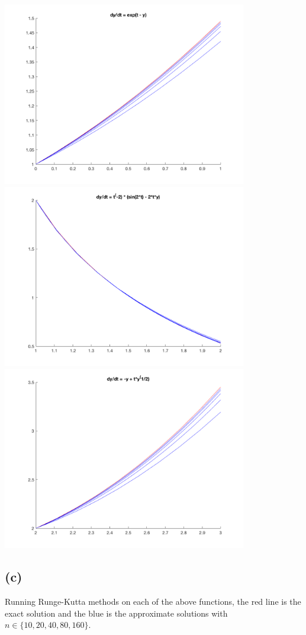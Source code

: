 \documentclass{article}
\begin{document}
\includegraphics[height=8cm]{parta_5}\\
\includegraphics[height=8cm]{parta_6}\\
\includegraphics[height=8cm]{parta_7}\\


\subsection*{(c)}
Running Runge-Kutta methods on each of the above functions, the red line is the exact solution and the blue is the approximate solutions with $ n \in \{ 10, 20, 40, 80, 160 \}$. 
\end{document}
